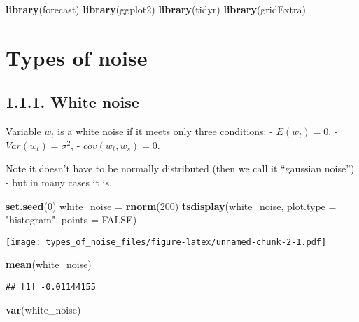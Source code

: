 \documentclass[]{article}
\author{}
\date{\vspace{-2.5em}}
\newenvironment{Shaded}{\begin{snugshade}}{\end{snugshade}}
\newcommand{\DataTypeTok}[1]{\textcolor[rgb]{0.13,0.29,0.53}{#1}}
\newcommand{\DecValTok}[1]{\textcolor[rgb]{0.00,0.00,0.81}{#1}}
\newcommand{\KeywordTok}[1]{\textcolor[rgb]{0.13,0.29,0.53}{\textbf{#1}}}
\newcommand{\NormalTok}[1]{#1}
\newcommand{\OtherTok}[1]{\textcolor[rgb]{0.56,0.35,0.01}{#1}}
\newcommand{\StringTok}[1]{\textcolor[rgb]{0.31,0.60,0.02}{#1}}
\begin{document}
\begin{Shaded}
\begin{Highlighting}[]
\KeywordTok{library}\NormalTok{(forecast)}
\KeywordTok{library}\NormalTok{(ggplot2)}
\KeywordTok{library}\NormalTok{(tidyr)}
\KeywordTok{library}\NormalTok{(gridExtra)}
\end{Highlighting}
\end{Shaded}

\hypertarget{types-of-noise}{%
\section{Types of noise}\label{types-of-noise}}

\hypertarget{white-noise}{%
\subsection{1.1.1. White noise}\label{white-noise}}

Variable \(w_t\) is a white noise if it meets only three conditions: -
\(E(w_t) = 0\), - \(Var(w_t) = \sigma^2\), - \(cov(w_t, w_s) = 0\).

Note it doesn't have to be normally distributed (then we call it
``gaussian noise'') - but in many cases it is.

\begin{Shaded}
\begin{Highlighting}[]
\KeywordTok{set.seed}\NormalTok{(}\DecValTok{0}\NormalTok{)}
\NormalTok{white_noise =}\StringTok{ }\KeywordTok{rnorm}\NormalTok{(}\DecValTok{200}\NormalTok{)}
\KeywordTok{tsdisplay}\NormalTok{(white_noise, }\DataTypeTok{plot.type =} \StringTok{"histogram"}\NormalTok{, }\DataTypeTok{points =} \OtherTok{FALSE}\NormalTok{)}
\end{Highlighting}
\end{Shaded}

\texttt{[image: types\_of\_noise\_files/figure-latex/unnamed-chunk-2-1.pdf]}

\begin{Shaded}
\begin{Highlighting}[]
\KeywordTok{mean}\NormalTok{(white_noise)}
\end{Highlighting}
\end{Shaded}

\begin{verbatim}
## [1] -0.01144155
\end{verbatim}

\begin{Shaded}
\begin{Highlighting}[]
\KeywordTok{var}\NormalTok{(white_noise)}
\end{Highlighting}
\end{Shaded}
\end{document}
